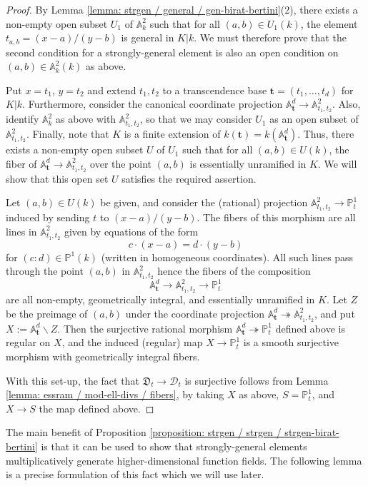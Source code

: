 \documentclass[11pt]{amsart}
\theoremstyle{definition}
\theoremstyle{remark}
\numberwithin{equation}{section}
\newcommand{\Abb}{\mathbb{A}}
\newcommand{\Pbb}{\mathbb{P}}
\newcommand{\Dcal}{\mathscr{D}}
\newcommand{\tbf}{\mathbf{t}}
\newcommand{\Dfrak}{\mathfrak{D}}
\begin{document}
\begin{proof}
  By Lemma \ref{lemma: strgen / general / gen-birat-bertini}(2), there exists a non-empty open subset $U_1$ of $\Abb^2_k$ such that for all $(a,b) \in U_1(k)$, the element $t_{a,b} = (x-a)/(y-b)$ is general in $K|k$.
  We must therefore prove that the second condition for a strongly-general element is also an open condition on $(a,b) \in \Abb^2_k(k)$ as above.

  Put $x = t_1$, $y = t_2$ and extend $t_1,t_2$ to a transcendence base $\tbf = (t_1,\ldots,t_d)$ for $K|k$.
  Furthermore, consider the canonical coordinate projection $\Abb^d_\tbf \rightarrow \Abb^2_{t_1,t_2}$.
  Also, identify $\Abb^2_k$ as above with $\Abb^2_{t_1,t_2}$, so that we may consider $U_1$ as an open subset of $\Abb^2_{t_1,t_2}$.
  Finally, note that $K$ is a finite extension of $k(\tbf) = k(\Abb^d_\tbf)$.
  Thus, there exists a non-empty open subset $U$ of $U_1$ such that for all $(a,b) \in U(k)$, the fiber of $\Abb^d_\tbf \rightarrow \Abb^2_{t_1,t_2}$ over the point $(a,b)$ is essentially unramified in $K$.
  We will show that this open set $U$ satisfies the required assertion.

  Let $(a,b) \in U(k)$ be given, and consider the (rational) projection $\Abb^2_{t_1,t_2} \rightarrow \Pbb^1_t$ induced by sending $t$ to $(x-a)/(y-b)$.
  The fibers of this morphism are all lines in $\Abb^2_{t_1,t_2}$ given by equations of the form
  \[ c \cdot (x-a) = d \cdot (y-b) \]
  for $(c:d) \in \Pbb^1(k)$ (written in homogeneous coordinates).
  All such lines pass through the point $(a,b)$ in $\Abb^2_{t_1,t_2}$ hence the fibers of the composition
  \[ \Abb^d_\tbf \rightarrow \Abb^2_{t_1,t_2} \rightarrow \Pbb^1_t \]
  are all non-empty, geometrically integral, and essentially unramified in $K$.
  Let $Z$ be the preimage of $(a,b)$ under the coordinate projection $\Abb^d_\tbf \twoheadrightarrow \Abb^2_{t_1,t_2}$, and put $X:= \Abb^d_\tbf \smallsetminus Z$.
  Then the surjective rational morphism $\Abb^d_\tbf \twoheadrightarrow \Pbb^1_t$ defined above is regular on $X$, and the induced (regular) map $X \rightarrow \Pbb^1_t$ is a smooth surjective morphism with geometrically integral fibers.
  
  With this set-up, the fact that $\Dfrak_t \rightarrow \Dcal_t$ is surjective follows from Lemma \ref{lemma: essram / mod-ell-divs / fibers}, by taking $X$ as above, $S = \Pbb^1_t$, and $X \rightarrow S$ the map defined above.
\end{proof}

The main benefit of Proposition \ref{proposition: strgen / strgen / strgen-birat-bertini} is that it can be used to show that strongly-general elements multiplicatively generate higher-dimensional function fields.
The following lemma is a precise formulation of this fact which we will use later.
\end{document}
